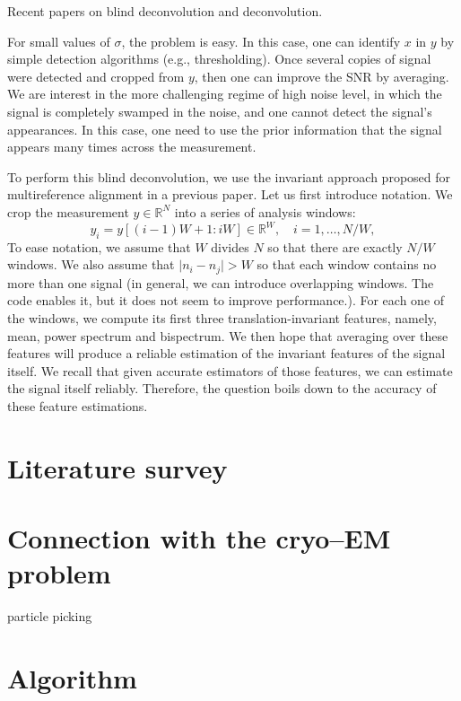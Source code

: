 \documentclass[12pt,a4paper]{article}
\numberwithin{equation}{section}
\numberwithin{figure}{section}
\theoremstyle{plain}
\theoremstyle{definition}
\theoremstyle{remark}
\theoremstyle{plain}
\theoremstyle{remark}
\theoremstyle{plain}
\theoremstyle{plain}
\newcommand{\RN}{\mathbb{R}^N}
\begin{document}
Recent papers on blind deconvolution and deconvolution.

For small values of $\sigma$,  the problem is easy. In this case, one can identify $x$ in $y$ by simple detection algorithms (e.g., thresholding). Once several copies of  signal were detected and cropped from $y$, then one can  improve the SNR by averaging. We are interest in the more challenging regime of high noise level, in which the signal is completely swamped in the noise, and one cannot detect the signal's appearances. In this case, one need to use the prior information that the signal appears many times across the measurement.

To perform this blind deconvolution, we use the invariant approach proposed for multireference alignment in a previous paper. Let us  first introduce  notation. We crop the measurement $y\in\RN$ into a series of analysis windows: 
\begin{equation}
y_i = y[(i-1)W + 1 : iW ]\in\mathbb{R}^W, \quad i=1,\ldots,N/W, 
\end{equation}
To ease notation, we assume that  $W$ divides $N$  so that there are exactly $N/W$ windows. We also assume that $\vert n_i - n_j\vert >W$ so that each window contains no more than one signal (in general, we can introduce overlapping windows. The code enables it, but it does not seem to improve performance.).
For each one of the windows, we compute its first three translation-invariant features, namely, mean, power spectrum and bispectrum. We then hope that averaging over these features will produce a reliable estimation of the invariant features of the signal itself. 
We recall that given accurate estimators of those features, we can estimate the signal itself reliably. Therefore, the question boils down to the accuracy of these feature estimations.


\section{Literature survey} \label{sec:literature}


\section{Connection with the cryo--EM problem} \label{sec:cryoEM}
particle picking 

\section{Algorithm} \label{sec:algorithm}
\end{document}
